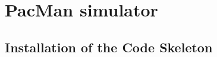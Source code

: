 \documentclass[article,english,nodocumentinfo,nosayenslogo,noicartslogo]{utbmciadreport}
\begin{document}





\section{PacMan simulator}

\subsection{Installation of the Code Skeleton}
\end{document}
